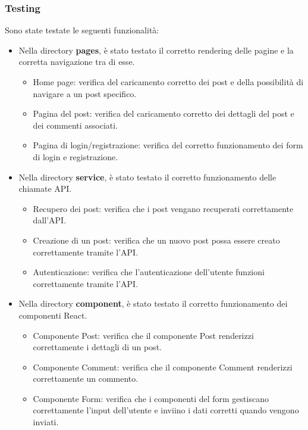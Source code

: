 \documentclass[8pt]{beamer}
\begin{document}
\begin{frame}[allowframebreaks]
    \frametitle{Testing}
    Sono state testate le seguenti funzionalità:
    \begin{itemize}
        \item Nella directory \textbf{pages}, è stato testato il corretto rendering delle pagine e la corretta navigazione tra di esse.
        \begin{itemize}
            \item Home page: verifica del caricamento corretto dei post e della possibilità di navigare a un post specifico.
            \item Pagina del post: verifica del caricamento corretto dei dettagli del post e dei commenti associati.
            \item Pagina di login/registrazione: verifica del corretto funzionamento dei form di login e registrazione.
        \end{itemize}
        \item Nella directory \textbf{service}, è stato testato il corretto funzionamento delle chiamate API.
        \begin{itemize}
            \item Recupero dei post: verifica che i post vengano recuperati correttamente dall'API.
            \item Creazione di un post: verifica che un nuovo post possa essere creato correttamente tramite l'API.
            \item Autenticazione: verifica che l'autenticazione dell'utente funzioni correttamente tramite l'API.
        \end{itemize}
        \item Nella directory \textbf{component}, è stato testato il corretto funzionamento dei componenti React.
        \begin{itemize}
            \item Componente Post: verifica che il componente Post renderizzi correttamente i dettagli di un post.
            \item Componente Comment: verifica che il componente Comment renderizzi correttamente un commento.
            \item Componente Form: verifica che i componenti del form gestiscano correttamente l'input dell'utente e inviino i dati corretti quando vengono inviati.
        \end{itemize}
    \end{itemize}
\end{frame}
\end{document}
